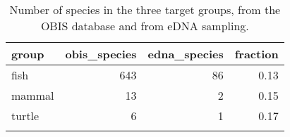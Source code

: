 \begin{longtable}{lrrr}
  \hline
group & obis\_species & edna\_species & fraction \\ 
  \hline
fish & 643 &  86 & 0.13 \\ 
  mammal &  13 &   2 & 0.15 \\ 
  turtle &   6 &   1 & 0.17 \\ 
   \hline
\hline
\caption{Number of species in the three target groups, from the OBIS database and from eDNA sampling.} 
\label{table:groups}
\end{longtable}
